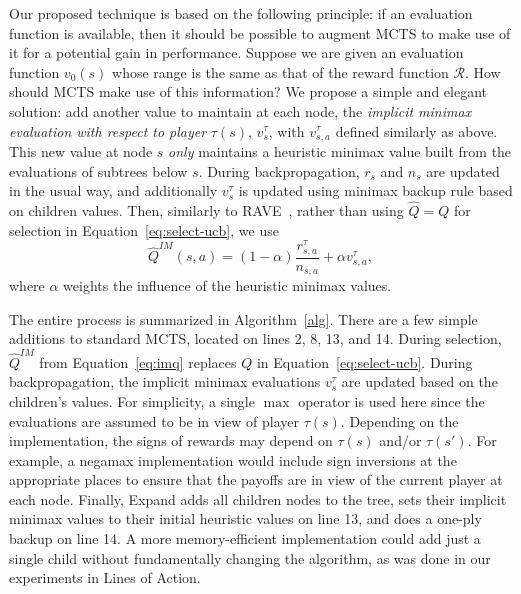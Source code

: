\documentclass{article}
\newcommand{\cR}{\mathcal{R}}
\newcommand{\hQ}{\hat{Q}}
\newcommand{\Expand}{{\sc Expand}}
\begin{document}
Our proposed technique is based on the following principle: if an evaluation function is available, then it should 
be possible to augment MCTS to make use of it for a potential gain in performance.  
Suppose we are given an evaluation function $v_0(s)$ whose range is the same as that of the reward function $\cR$. 
How should MCTS make use of this information? 
We propose a simple and elegant solution: add another value to maintain at each node, the 
{\it implicit minimax evaluation with respect to player} $\tau(s)$, $v^{\tau}_s$, with $v^{\tau}_{s,a}$ defined similarly 
as above. 
This new value at node $s$ {\it only} maintains a heuristic minimax value built from the evaluations of subtrees below $s$. 
During backpropagation, $r_s$ and $n_s$ are updated in the usual way, and additionally $v^{\tau}_s$ is updated using minimax backup 
rule based on children values. Then, similarly to RAVE~\cite{Gelly07Combining}, rather than using $\hQ = Q$ for 
selection in Equation~\ref{eq:select-ucb}, we use
\begin{equation}
\label{eq:imq}
\hQ^{\mathit{IM}}(s,a) = (1-\alpha) \frac{r^{\tau}_{s,a}}{n_{s,a}} + \alpha v^{\tau}_{s,a}, 
\end{equation}
where $\alpha$ weights the influence of the heuristic minimax values.

The entire process is summarized in Algorithm~\ref{alg}. There are a few simple additions to standard MCTS,
located on lines 2, 8, 13, and 14.
During selection, $\hQ^{\mathit{IM}}$ from Equation~\ref{eq:imq} replaces $Q$ in 
Equation~\ref{eq:select-ucb}. During backpropagation, the implicit minimax evaluations $v^{\tau}_s$ are updated based on 
the children's values. 
For simplicity, a single $\max$ operator is used here since the evaluations are assumed to be in 
view of player $\tau(s)$. 
Depending on the implementation, the signs of rewards may depend on $\tau(s)$ and/or $\tau(s')$.
For example, a negamax implementation would include sign inversions at the appropriate places 
to ensure that the payoffs are in view of the current player at each node.  
Finally, \Expand\xspace adds all children nodes to the tree, sets their implicit minimax values to their initial
heuristic values on line 13, and does a one-ply backup on line 14. 
A more memory-efficient implementation could add just a single child without fundamentally changing
the algorithm, as was done in our experiments in Lines of Action.
\end{document}
